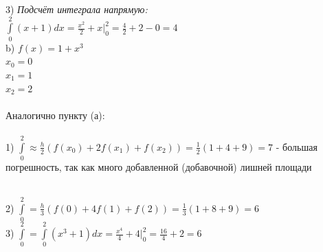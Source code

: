 \documentclass{article}
\begin{document}
3) \large\textit{Подсчёт интеграла напрямую:}\\
\normalsize
$ \int\limits^2_0 (x + 1)dx = \frac{x^2}{2} + x |^2_0 = \frac{4}{2} + 2 - 0 = 4 $\\
\newpage
\Large b) $ f(x) = 1 + x^3 $\\
\normalsize
$ x_0 = 0 $\\
$ x_1 = 1 $\\
$ x_2 = 2 $\\\\
Аналогично пункту (а):\\\\
1) $ \int\limits^2_0 \approx \frac{h}{2} (f(x_0) + 2f(x_1) + f(x_2)) = \frac{1}{2} (1+4+9) = 7 $ - большая погрешность, так как много добавленной (добавочной) лишней площади\\
\begin{figure}[h!]
\end{figure}
\\
2) $ \int\limits^2_0 = \frac{h}{3} (f(0) + 4f(1) + f(2)) = \frac{1}{3} (1+8+9) = 6 $\\
3) $ \int\limits^2_0 = \int\limits^2_0 (x^3 + 1)dx = \frac{x^4}{4} + 4 |^2_0 = \frac{16}{4} + 2 = 6 $
\end{document}
